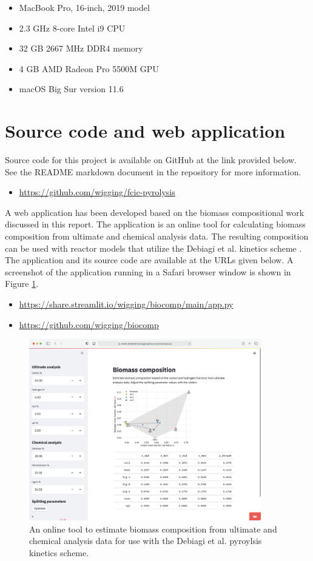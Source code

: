\begin{itemize}
    \item MacBook Pro, 16-inch, 2019 model
    \item 2.3 GHz 8-core Intel i9 CPU
    \item 32 GB 2667 MHz DDR4 memory
    \item 4 GB AMD Radeon Pro 5500M GPU
    \item macOS Big Sur version 11.6
\end{itemize}

\section{Source code and web application}

Source code for this project is available on GitHub at the link provided below. See the README markdown document in the repository for more information.

\begin{itemize}
    \item \url{https://github.com/wigging/fcic-pyrolysis}
\end{itemize}

A web application has been developed based on the biomass compositional work discussed in this report. The application is an online tool for calculating biomass composition from ultimate and chemical analysis data. The resulting composition can be used with reactor models that utilize the Debiagi et al. kinetics scheme \cite{Debiagi-2018}. The application and its source code are available at the URLs given below. A screenshot of the application running in a Safari browser window is shown in Figure \ref{fig:webtool}.

\begin{itemize}
    \item \url{https://share.streamlit.io/wigging/biocomp/main/app.py}
    \item \url{https://github.com/wigging/biocomp}
\end{itemize}

\begin{figure}[H]
    \centering
    \includegraphics[width=0.9\textwidth]{figures/webtool.png}
    \caption{An online tool to estimate biomass composition from ultimate and chemical analysis data for use with the Debiagi et al. pyroylsis kinetics scheme.}
    \label{fig:webtool}
\end{figure}
